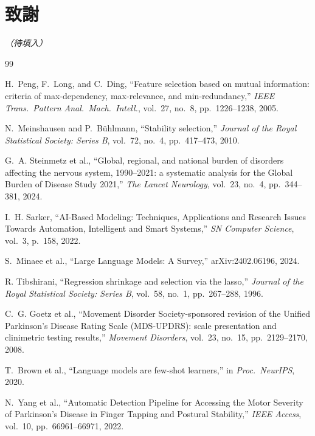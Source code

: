 \documentclass[12pt, a4paper]{article}
\begin{document}
\section*{致謝}
\textit{（待填入）}

\begin{thebibliography}{99}

H.~Peng, F.~Long, and C.~Ding,
``Feature selection based on mutual information: criteria of max-dependency,
max-relevance, and min-redundancy,''
\textit{IEEE Trans.\ Pattern Anal.\ Mach.\ Intell.}, vol.~27, no.~8,
pp.~1226--1238, 2005.

N.~Meinshausen and P.~B\"{u}hlmann,
``Stability selection,''
\textit{Journal of the Royal Statistical Society: Series B}, vol.~72, no.~4,
pp.~417--473, 2010.

G.~A. Steinmetz et al.,
``Global, regional, and national burden of disorders affecting the nervous
system, 1990--2021: a systematic analysis for the Global Burden of Disease
Study 2021,''
\textit{The Lancet Neurology}, vol.~23, no.~4, pp.~344--381, 2024.

I.~H. Sarker,
``AI-Based Modeling: Techniques, Applications and Research Issues
Towards Automation, Intelligent and Smart Systems,''
\textit{SN Computer Science}, vol.~3, p.~158, 2022.

S.~Minaee et al.,
``Large Language Models: A Survey,''
arXiv:2402.06196, 2024.

R. Tibshirani,
``Regression shrinkage and selection via the lasso,''
\textit{Journal of the Royal Statistical Society: Series B}, vol.~58, no.~1,
pp.~267--288, 1996.

C.~G. Goetz et al.,
``Movement Disorder Society-sponsored revision of the Unified Parkinson's Disease
Rating Scale (MDS-UPDRS): scale presentation and clinimetric testing results,''
\textit{Movement Disorders}, vol.~23, no.~15, pp.~2129--2170, 2008.

T.~Brown et al.,
``Language models are few-shot learners,''
in \textit{Proc.\ NeurIPS}, 2020.

N.~Yang et al.,
``Automatic Detection Pipeline for Accessing the Motor Severity of
Parkinson's Disease in Finger Tapping and Postural Stability,''
\textit{IEEE Access}, vol.~10, pp.~66961--66971, 2022.


\end{thebibliography}
\end{document}

